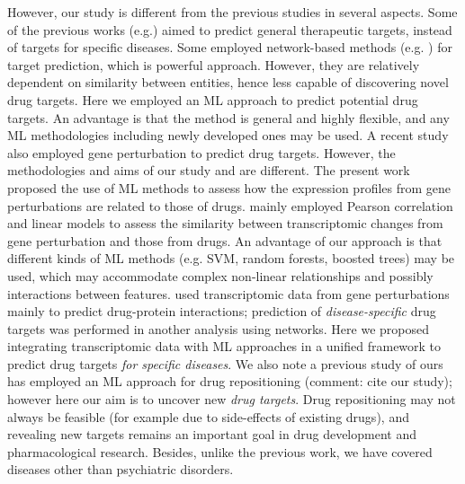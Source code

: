     However, our study is different from the previous studies in several aspects. Some of the previous works (e.g.\cite {ferrero2017silico, bakheet2009properties, kumari2015identification, li2007prediction}) aimed to predict general therapeutic targets, instead of targets for specific diseases. Some employed network-based methods (e.g. \cite{sawada2018predicting, li2015large, emig2013drug}) for target prediction, which is powerful approach. However, they are relatively dependent on similarity between entities, hence less capable of discovering novel drug targets. Here we employed an ML approach to predict potential drug targets. An advantage is that the method is general and highly flexible, and any ML methodologies including newly developed ones may be used. A recent study  \cite{sawada2018predicting} also employed gene perturbation to predict drug targets. However, the methodologies and aims of our study and \cite{sawada2018predicting} are different. The present work proposed the use of ML methods to assess how the expression profiles from gene perturbations are related to those of drugs. \cite {sawada2018predicting} mainly employed Pearson correlation and linear models to assess the similarity between transcriptomic changes from gene perturbation and those from drugs. An advantage of our approach is that different kinds of ML methods (e.g. SVM, random forests, boosted trees) may be used, which may accommodate complex non-linear relationships and possibly interactions between features.  \cite {sawada2018predicting} used transcriptomic data from gene perturbations mainly to predict drug-protein interactions; prediction of \textit{disease-specific} drug targets was performed in another analysis using networks. Here we proposed integrating transcriptomic data with ML approaches in a unified framework to predict drug targets\textit{}\textit{ for specific diseases}. We also note a previous study of ours has employed an ML approach for drug repositioning (comment: cite our study); however here our aim is to uncover new \textit{drug targets}. Drug repositioning may not always be feasible (for example due to side-effects of existing drugs), and revealing new targets remains an important goal in drug development and pharmacological research.  Besides, unlike the previous work, we have covered diseases other than psychiatric disorders. 

